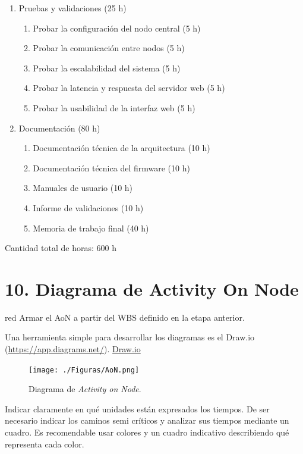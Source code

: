 \documentclass[
11pt, %
]{charter}
\begin{document}
\begin{enumerate}
\item Pruebas y validaciones (25 h)
	\begin{enumerate}
	\item Probar la configuración del nodo central (5 h)
	\item Probar la comunicación entre nodos (5 h)
	\item Probar la escalabilidad del sistema (5 h)
	\item Probar la latencia y respuesta del servidor web (5 h)
	\item Probar la usabilidad de la interfaz web (5 h)
	\end{enumerate}
	
\item Documentación (80 h)
	\begin{enumerate}
	\item Documentación técnica de la arquitectura (10 h)
	\item Documentación técnica del firmware (10 h)
	\item Manuales de usuario (10 h)
	\item Informe de validaciones (10 h)
	\item Memoria de trabajo final (40 h)
	\end{enumerate}
\end{enumerate}

Cantidad total de horas: 600 h

\section{10. Diagrama de Activity On Node}
\label{sec:AoN}

\begin{consigna}{red}
Armar el AoN a partir del WBS definido en la etapa anterior.

Una herramienta simple para desarrollar los diagramas es el Draw.io (\url{https://app.diagrams.net/}).
\href{https://app.diagrams.net}{Draw.io}


\begin{figure}[htpb]
\centering 
\texttt{[image: ./Figuras/AoN.png]}
\caption{Diagrama de \textit{Activity on Node}.}
\label{fig:AoN}
\end{figure}

Indicar claramente en qué unidades están expresados los tiempos.
De ser necesario indicar los caminos semi críticos y analizar sus tiempos mediante un cuadro.
Es recomendable usar colores y un cuadro indicativo describiendo qué representa cada color.

\end{consigna}
\end{document}
